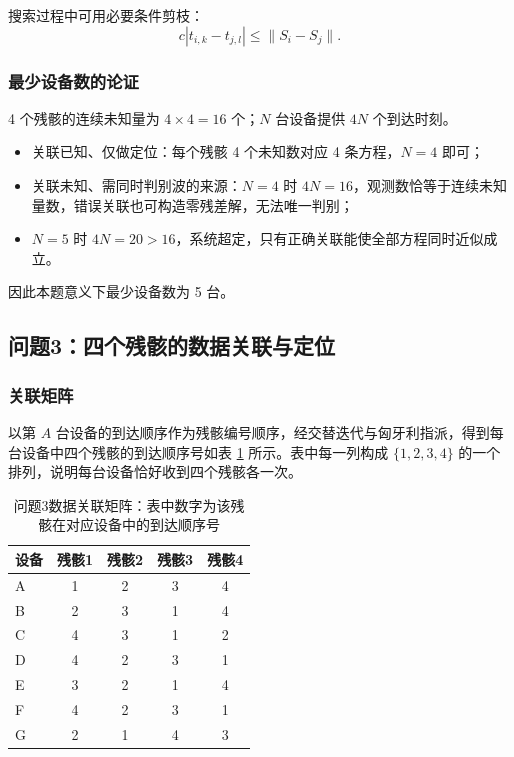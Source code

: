 \documentclass[12pt,a4paper]{article}
\begin{document}
搜索过程中可用必要条件剪枝：
\[
c|t_{i,k}-t_{j,l}|\le\|S_i-S_j\|.
\]

\subsubsection{最少设备数的论证}

4 个残骸的连续未知量为 $4\times4=16$ 个；$N$ 台设备提供 $4N$ 个到达时刻。

\begin{itemize}
  \item 关联已知、仅做定位：每个残骸 4 个未知数对应 4 条方程，$N=4$ 即可；
  \item 关联未知、需同时判别波的来源：$N=4$ 时 $4N=16$，观测数恰等于连续未知量数，错误关联也可构造零残差解，无法唯一判别；
  \item $N=5$ 时 $4N=20>16$，系统超定，只有正确关联能使全部方程同时近似成立。
\end{itemize}

因此本题意义下最少设备数为 5 台。

\subsection{问题3：四个残骸的数据关联与定位}

\subsubsection{关联矩阵}

以第 $A$ 台设备的到达顺序作为残骸编号顺序，经交替迭代与匈牙利指派，得到每台设备中四个残骸的到达顺序号如表 \ref{tab:assoc} 所示。表中每一列构成 $\{1,2,3,4\}$ 的一个排列，说明每台设备恰好收到四个残骸各一次。

\begin{table}[H]
\centering
\caption{问题3数据关联矩阵：表中数字为该残骸在对应设备中的到达顺序号}
\label{tab:assoc}
\begin{tabular}{lcccc}
\toprule
设备 & 残骸1 & 残骸2 & 残骸3 & 残骸4 \\
\midrule
A & 1 & 2 & 3 & 4 \\
B & 2 & 3 & 1 & 4 \\
C & 4 & 3 & 1 & 2 \\
D & 4 & 2 & 3 & 1 \\
E & 3 & 2 & 1 & 4 \\
F & 4 & 2 & 3 & 1 \\
G & 2 & 1 & 4 & 3 \\
\bottomrule
\end{tabular}
\end{table}
\end{document}
